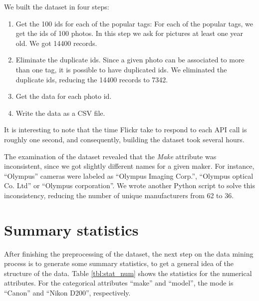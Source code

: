 \documentclass[letter,12pt]{article}
\begin{document}
We built the dataset in four steps:

\begin{enumerate}
\item Get the 100 ids for each of the popular tags: For each of the popular tags, we get the ids of 100 photos. In this step we ask for pictures at least one year old. We got 14400 records.
\item Eliminate the duplicate ids. Since a given photo can be associated to more than one tag, it is possible to have duplicated ids. We eliminated the duplicate ids, reducing the 14400 records to 7342.
\item Get the data for each photo id.
\item Write the data as a CSV file.
\end{enumerate}

It is interesting to note that the time Flickr take to respond to each API call is roughly one second, and consequently, building the dataset took several hours.

The examination of the dataset revealed that the \emph{Make} attribute was inconsistent, since we got slightly different names for a given maker. For instance, ``Olympus'' cameras were labeled as ``Olympus Imaging Corp.'', ``Olympus optical Co. Ltd'' or ``Olympus corporation''. We wrote another Python script to solve this inconsistency, reducing the number of unique manufacturers from 62 to 36.

\section{Summary statistics}

After finishing the preprocessing of the dataset, the next step on the data mining process is to generate some summary statistics, to get a general idea of the structure of the data. Table \ref{tbl:stat_num} shows the statistics for the numerical attributes. For the categorical attributes ``make'' and ``model'', the mode is ``Canon'' and ``Nikon D200'', respectively. 
\end{document}
